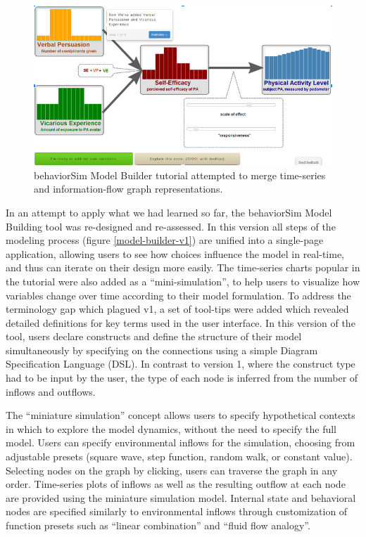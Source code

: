 \documentclass{sigchi}
\begin{document}
\begin{figure}[!t]
  \centering
  \includegraphics[width=0.9\columnwidth]{img/v1-flow}  
  \caption{behaviorSim Model Builder tutorial attempted to merge time-series and information-flow graph representations.}
  \label{model-builder-tutorial}
\end{figure}

In an attempt to apply what we had learned so far, the behaviorSim Model Building tool was re-designed and re-assessed.
In this version all steps of the modeling process (figure \ref{model-builder-v1})  are unified into a single-page application, allowing users to see how choices influence the model in real-time, and thus can iterate on their design more easily.
The time-series charts popular in the tutorial were also added as a ``mini-simulation'', to help users to visualize how variables change over time according to their model formulation.
To address the terminology gap which plagued v1, a set of tool-tips were added which revealed detailed definitions for key terms used in the user interface.
In this version of the tool, users declare constructs and define the structure of their model simultaneously by specifying on the connections using a simple Diagram Specification Language (DSL). 
In contrast to version 1, where the construct type had to be input by the user, the type of each node is inferred from the number of inflows and outflows.

The ``miniature simulation'' concept allows users to specify hypothetical contexts in which to explore the model dynamics, without the need to specify the full model.
Users can specify environmental inflows for the simulation, choosing from adjustable presets (square wave, step function, random walk, or constant value).
Selecting nodes on the graph by clicking, users can traverse the graph in any order.
Time-series plots of inflows as well as the resulting outflow at each node are provided using the miniature simulation model.
Internal state and behavioral nodes are specified similarly to environmental inflows through customization of function presets such as ``linear combination'' and ``fluid flow analogy''\cite{martin2014dynamical}.
\end{document}
